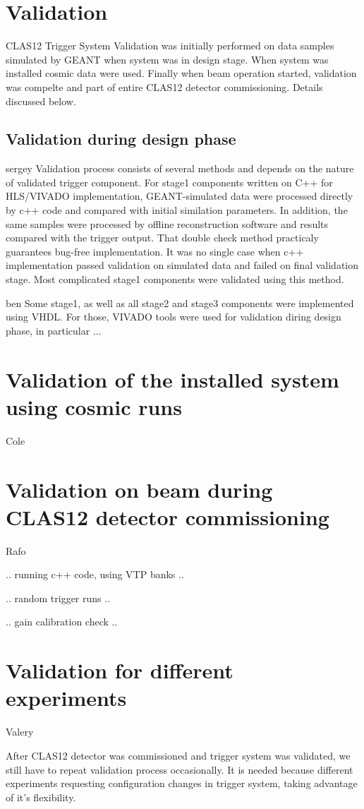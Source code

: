 \section{Validation}

CLAS12 Trigger System Validation was initially performed on data samples simulated by GEANT when system was in design stage. When system was installed cosmic data were used. Finally when beam operation started, validation was compelte and part of entire CLAS12 detector commissioning. Details discussed below.

\subsection{Validation during design phase}

sergey
Validation process consists of several methods and depends on the nature of validated trigger component. For stage1 components written on C++ for HLS/VIVADO implementation, GEANT-simulated data were processed directly by c++ code and compared with initial similation parameters. In addition, the same samples were processed by offline reconstruction software and results compared with the trigger output. That double check method practicaly guarantees bug-free implementation. It was no single case when c++ implementation passed validation on simulated data and failed on final validation stage. Most complicated stage1 components were validated using this method.

ben
Some stage1, as well as all stage2 and stage3 components were implemented using VHDL. For those, VIVADO tools were used for validation diring design phase, in particular ...

\section{Validation of the installed system using cosmic runs} Cole

\section{Validation on beam during CLAS12 detector commissioning} Rafo

.. running c++ code, using VTP banks ..

.. random trigger runs .. 

.. gain calibration check .. 


\section{Validation for different experiments} Valery

After CLAS12 detector was commissioned and trigger system was validated, we still have to repeat validation process occasionally. It is needed because different experiments requesting configuration changes in trigger system, taking advantage of it's flexibility.